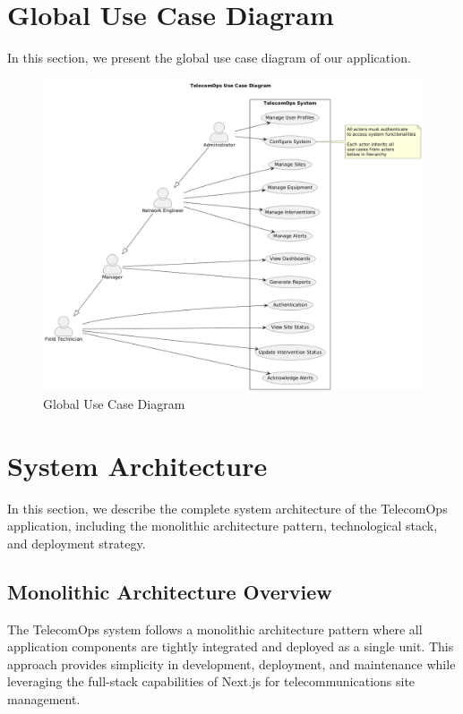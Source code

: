 \section{Global Use Case Diagram}
In this section, we present the global use case diagram of our application.
\begin{figure}[hbt!]
    \centering
    \includegraphics[width=0.95\linewidth]{img/chap_02/TelecomOps_UseCase_Diagram.png}
    \caption{Global Use Case Diagram}
    \label{fig:use_case_global}
\end{figure}\vspace{1cm}

\section{System Architecture}
In this section, we describe the complete system architecture of the TelecomOps application, including the monolithic architecture pattern, technological stack, and deployment strategy.

\subsection{Monolithic Architecture Overview}
The TelecomOps system follows a monolithic architecture pattern where all application components are tightly integrated and deployed as a single unit. This approach provides simplicity in development, deployment, and maintenance while leveraging the full-stack capabilities of Next.js for telecommunications site management.

